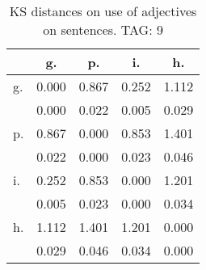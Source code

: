 \begin{table}[h!]
\begin{center}
\begin{tabular}{| l | c | c | c | c |}\hline
 & g. & p. & i. & h. \\\hline
g. & 0.000  & 0.867  & 0.252  & 1.112 \\\hline
 & 0.000  & 0.022  & 0.005  & 0.029 \\\hline
p. & 0.867  & 0.000  & 0.853  & 1.401 \\\hline
 & 0.022  & 0.000  & 0.023  & 0.046 \\\hline
i. & 0.252  & 0.853  & 0.000  & 1.201 \\\hline
 & 0.005  & 0.023  & 0.000  & 0.034 \\\hline
h. & 1.112  & 1.401  & 1.201  & 0.000 \\\hline
 & 0.029  & 0.046  & 0.034  & 0.000 \\\hline
\end{tabular}
\caption{KS distances on use of adjectives on sentences. TAG: 9}
\end{center}
\end{table}